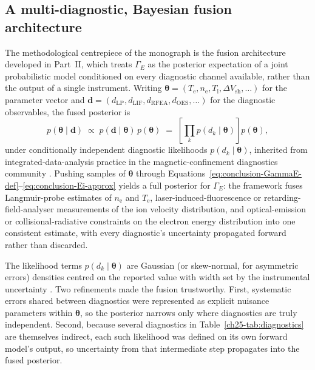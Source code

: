 \subsection{A multi-diagnostic, Bayesian fusion architecture}
\label{ssec:conclusion-fusion}

The methodological centrepiece of the monograph is the fusion architecture developed in Part~II, which treats $\Gamma_{E}$ as the posterior expectation of a joint probabilistic model conditioned on every diagnostic channel available, rather than the output of a single instrument. Writing $\boldsymbol{\theta} = (T_{\mathrm{e}}, n_{\mathrm{e}}, T_{\mathrm{i}}, \Delta V_{\mathrm{sh}}, \ldots)$ for the parameter vector and $\mathbf{d} = (d_{\mathrm{LP}}, d_{\mathrm{LIF}}, d_{\mathrm{RFEA}}, d_{\mathrm{OES}}, \ldots)$ for the diagnostic observables, the fused posterior is
\begin{equation}
p(\boldsymbol{\theta} \mid \mathbf{d}) \;\propto\; p(\mathbf{d} \mid \boldsymbol{\theta})\, p(\boldsymbol{\theta}) \;=\; \left[ \prod_{k} p(d_{k} \mid \boldsymbol{\theta}) \right] p(\boldsymbol{\theta}) ,
\label{eq:conclusion-bayes}
\end{equation}
under conditionally independent diagnostic likelihoods $p(d_{k} \mid \boldsymbol{\theta})$, inherited from integrated-data-analysis practice in the magnetic-confinement diagnostics community \cite{ref0706,ref0707,ref0709,ref0727}. Pushing samples of $\boldsymbol{\theta}$ through Equations~\eqref{eq:conclusion-GammaE-def}--\eqref{eq:conclusion-Ei-approx} yields a full posterior for $\Gamma_{E}$: the framework fuses Langmuir-probe estimates of $n_{\mathrm{e}}$ and $T_{\mathrm{e}}$, laser-induced-fluorescence or retarding-field-analyser measurements of the ion velocity distribution, and optical-emission or collisional-radiative constraints on the electron energy distribution into one consistent estimate, with every diagnostic's uncertainty propagated forward rather than discarded.

The likelihood terms $p(d_{k} \mid \boldsymbol{\theta})$ are Gaussian (or skew-normal, for asymmetric errors) densities centred on the reported value with width set by the instrumental uncertainty \cite{ref0709}. Two refinements made the fusion trustworthy. First, systematic errors shared between diagnostics were represented as explicit nuisance parameters within $\boldsymbol{\theta}$, so the posterior narrows only where diagnostics are truly independent. Second, because several diagnostics in Table~\ref{ch25-tab:diagnostics} are themselves indirect, each such likelihood was defined on its own forward model's output, so uncertainty from that intermediate step propagates into the fused posterior.

